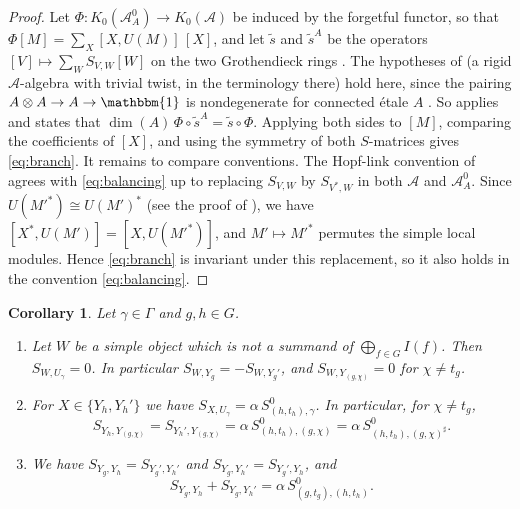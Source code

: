 \documentclass[10pt]{article}
\theoremstyle{plain}
\newtheorem{corollary}[theorem]{Corollary}
\theoremstyle{definition}
\theoremstyle{plain}
\begin{document}
\begin{proof}
Let $\Phi\colon K_0(\mathcal{A}_A^0)\to K_0(\mathcal{A})$ be induced by the forgetful functor, so that $\Phi[M]=\sum_X[X,U(M)]\,[X]$, and let $\tilde s$ and $\tilde s^A$ be the operators $[V]\mapsto\sum_WS_{V,W}[W]$ on the two Grothendieck rings \cite[(4.2)]{MR1936496}. The hypotheses of \cite{MR1936496} (a rigid $\mathcal{A}$-algebra with trivial twist, in the terminology there) hold here, since the pairing $A\otimes A\to A\to\mathbbm{1}$ is nondegenerate for connected \'etale $A$ \cite[Remark 3.4]{MR3039775}. So \cite[Theorem 4.1]{MR1936496} applies and states that $\dim(A)\,\Phi\circ\tilde s^A=\tilde s\circ\Phi$. Applying both sides to $[M]$, comparing the coefficients of $[X]$, and using the symmetry of both $S$-matrices gives \eqref{eq:branch}. It remains to compare conventions. The Hopf-link convention of \cite{MR1936496} agrees with \eqref{eq:balancing} up to replacing $S_{V,W}$ by $S_{V^\ast,W}$ in both $\mathcal{A}$ and $\mathcal{A}^0_A$. Since $U(M'^\ast)\cong U(M')^\ast$ (see the proof of \cite[Theorem 1.15]{MR1936496}), we have $[X^\ast,U(M')]=[X,U(M'^\ast)]$, and $M'\mapsto M'^\ast$ permutes the simple local modules. Hence \eqref{eq:branch} is invariant under this replacement, so it also holds in the convention \eqref{eq:balancing}.
\end{proof}

\begin{corollary}\label{cor:branch}
Let $\gamma\in\Gamma$ and $g,h\in G$.
\begin{enumerate}
\item Let $W$ be a simple object which is not a summand of $\bigoplus_{f\in G}I(f)$. Then $S_{W,U_\gamma}=0$. In particular $S_{W,Y_g}=-S_{W,Y_g'}$, and $S_{W,Y_{(g,\chi)}}=0$ for $\chi\neq t_g$.
\item For $X\in\{Y_h,Y_h'\}$ we have $S_{X,U_\gamma}=\alpha\,S^0_{(h,t_h),\gamma}$. In particular, for $\chi\neq t_g$,
\[
S_{Y_h,Y_{(g,\chi)}}=S_{Y_h',Y_{(g,\chi)}}=\alpha\,S^0_{(h,t_h),(g,\chi)}=\alpha\,S^0_{(h,t_h),(g,\chi)^\sharp}.
\]
\item We have $S_{Y_g,Y_h}=S_{Y_g',Y_h'}$ and $S_{Y_g,Y_h'}=S_{Y_g',Y_h}$, and
\[
S_{Y_g,Y_h}+S_{Y_g,Y_h'}=\alpha\,S^0_{(g,t_g),(h,t_h)}.
\]
\end{enumerate}
\end{corollary}
\end{document}
